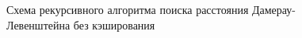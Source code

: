 \begin{figure}[h]
	
	
	\caption{Схема рекурсивного алгоритма поиска расстояния Дамерау-Левенштейна без кэширования}
	
	\label{fig:recursive}
	
\end{figure}

\clearpage

